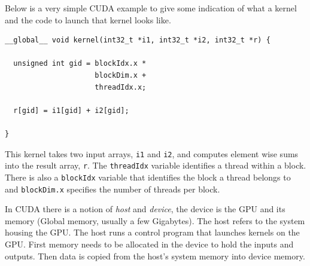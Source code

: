 \documentclass[a4paper]{book}
\begin{document}
Below is a very simple CUDA example to give some indication of what a kernel and 
the code to launch that kernel looks like. 

\begin{small}
\begin{Verbatim}[samepage=true]
__global__ void kernel(int32_t *i1, int32_t *i2, int32_t *r) {
  
  unsigned int gid = blockIdx.x * 
                     blockDim.x + 
                     threadIdx.x;

  r[gid] = i1[gid] + i2[gid]; 

} 

\end{Verbatim}
\end{small}

This kernel takes two input arrays, {\tt i1} and {\tt i2}, and computes 
element wise sums into the result array, {\tt r}. The {\tt threadIdx} variable identifies 
a thread within a block. There is also a {\tt blockIdx} variable that identifies 
the block a thread belongs to and {\tt blockDim.x} specifies the number of threads per block. 


In CUDA there is a notion of {\em host} and {\em device}, the device is the GPU and 
its memory (Global memory, usually a few Gigabytes). The host refers to the system housing 
the GPU. The host runs a control program that launches kernels on the GPU. First memory 
needs to be allocated in the device to hold the inputs and outputs. Then data is copied from 
the host's system memory into device memory. 
\end{document}
